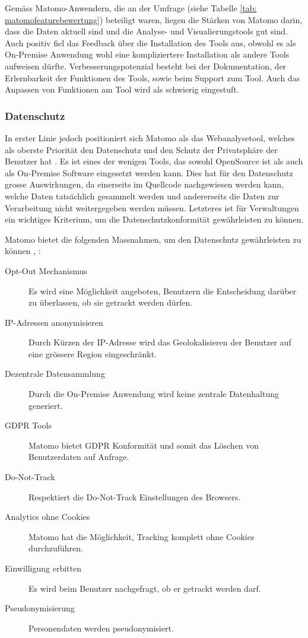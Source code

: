 Gemäss Matomo-Anwendern, die an der Umfrage (siehe Tabelle \ref{tab: matomofeaturebewertung}) beteiligt waren, liegen die Stärken von Matomo darin, dass die Daten aktuell sind und die Analyse- und Visualierungstools gut sind. 
Auch positiv fiel das Feedback über die Installation des Tools aus, obwohl es als On-Premise Anwendung wohl eine kompliziertere Installation als andere Tools aufweisen dürfte.
Verbesserungspotenzial besteht bei der Dokumentation, der Erlernbarkeit der Funktionen des Tools, sowie beim Support zum Tool. Auch das Anpassen von Funktionen am Tool wird als schwierig eingestuft.
\newpage
\subsubsection{Datenschutz}
In erster Linie jedoch positioniert sich Matomo als das Webanalysetool, welches als oberste Priorität den Datenschutz und den Schutz der Privatsphäre der Benutzer hat \parencite{MamotoPrivacy}. Es ist eines der wenigen Tools, das sowohl OpenSource ist als auch als On-Premise Software eingesetzt werden kann. Dies hat für den Datenschutz grosse Auswirkungen, da einerseits im Quellcode nachgewiesen werden kann, welche Daten tatsächlich gesammelt werden und andererseits die Daten zur Verarbeitung nicht weitergegeben werden müssen. Letzteres ist für Verwaltungen ein wichtiges Kriterium, um die Datenschutzkonformität gewährleisten zu können.

Matomo bietet die folgenden Massnahmen, um den Datenschutz gewährleisten zu können \parencite{MamotoFeatures}, \parencite{MamotoPrivacy}:

\begin{description}
  \item[Opt-Out Mechanismus] Es wird eine Möglichkeit angeboten, Benutzern die Entscheidung darüber zu überlassen, ob sie getrackt werden dürfen.
  \item[IP-Adressen anonymisieren] Durch Kürzen der IP-Adresse wird das Geolokalisieren der Benutzer auf eine grössere Region eingeschränkt.
  \item[Dezentrale Datensammlung] Durch die On-Premise  Anwendung wird keine zentrale Datenhaltung generiert.
  \item[GDPR Tools] Matomo bietet GDPR Konformität und somit das Löschen von Benutzerdaten auf Anfrage.  
  \item[Do-Not-Track] Respektiert die Do-Not-Track Einstellungen des Browsers.
  \item[Analytics ohne Cookies] Matomo hat die Möglichkeit, Tracking komplett ohne Cookies durchzuführen.
  \item[Einwilligung erbitten] Es wird beim Benutzer nachgefragt, ob er getrackt werden darf.
  \item[Pseudonymisierung] Personendaten werden pseudonymisiert.  
\end{description}

